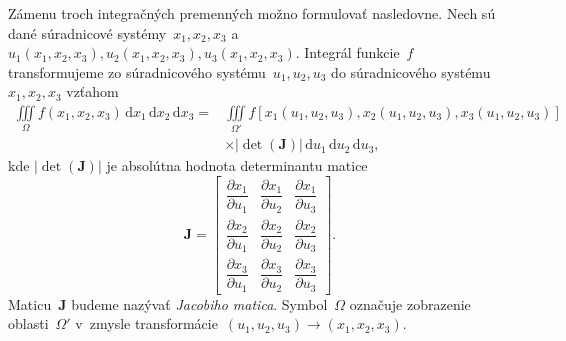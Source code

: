 \documentclass[a4paper, 12pt]{book}
\newcommand{\diff}{\mathrm d}
\let\vec\mathbf
\begin{document}
Zámenu troch integračných premenných možno formulovať nasledovne.  Nech sú dané 
súradnicové systémy~$x_1, x_2, x_3$ a~$u_1(x_1, x_2, x_3), u_2(x_1, x_2, x_3), 
u_3(x_1, x_2, x_3)$.  Integrál funkcie~$f$ transformujeme zo súradnicového 
systému~$u_1, u_2, u_3$ do súradnicového systému~$x_1, x_2, x_3$ vzťahom 
\parencite[napríklad][]{Arfken2005,Olver2010}
%
\begin{equation}
\label{eq:iiint_change_of_variable}
\begin{split}
\iiint\limits_{\Omega} f(x_1, x_2, x_3) \, \diff x_1 \, \diff x_2 \, \diff x_3 
 =& \iiint\limits_{\Omega'} f[x_1(u_1, u_2, u_3), x_2(u_1, u_2, u_3), x_3(u_1, 
 u_2, u_3)] \\
& \times | \det(\mathbf{J}) | \, \diff u_1 \, \diff u_2 \, \diff u_3{,}
\end{split}
\end{equation}
%
kde $| \det(\mathbf{J}) |$ je absolútna hodnota determinantu matice
%
\begin{equation}
\label{eq:jacobi}
\mathbf{J} = 
\begin{bmatrix}
\dfrac{\partial x_1}{\partial{u_1}} & \dfrac{\partial x_1}{\partial{u_2}} 
& \dfrac{\partial x_1}{\partial{u_3}}\\[2ex]
%
\dfrac{\partial x_2}{\partial{u_1}} & \dfrac{\partial x_2}{\partial{u_2}} 
& \dfrac{\partial x_2}{\partial{u_3}}\\[2ex]
%
\dfrac{\partial x_3}{\partial{u_1}} & \dfrac{\partial x_3}{\partial{u_2}} 
& \dfrac{\partial x_3}{\partial{u_3}}
\end{bmatrix}
%
{.}
\end{equation}
%
Maticu~$\vec J$ budeme nazývať \emph{Jacobiho matica}.  Symbol~$\Omega$ 
označuje zobrazenie oblasti~$\Omega'$ v~zmysle transformácie~$(u_1, u_2, u_3) 
\rightarrow (x_1, x_2, x_3)$.
\end{document}
